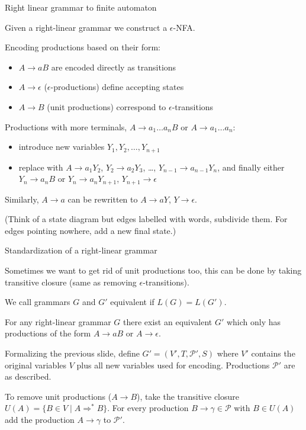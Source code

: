 \documentclass[handout]{beamer}
\begin{document}
\begin{frame}{Right linear grammar to finite automaton}

	Given a right-linear grammar we construct a $\epsilon$-NFA.

	Encoding productions based on their form: 
	\begin{itemize}
		\item $A\rightarrow aB$ are encoded directly as transitions
		\item $A\rightarrow\epsilon$ (\alert{$\epsilon$-productions}) define accepting states
		\item $A\rightarrow B$ (\alert{unit productions}) correspond to $\epsilon$-transitions
	\end{itemize}
	
	Productions with more terminals, $A\rightarrow a_1\dots a_n B$ or $A\rightarrow a_1\dots a_n$:
		
	\begin{itemize}
		\item  introduce new variables $Y_1,Y_2,\dots, Y_{n+1}$
		\item  replace with $A\rightarrow a_1Y_2$, $Y_2\rightarrow a_2Y_3$, \dots, $Y_{n-1}\rightarrow a_{n-1}Y_n$, and finally either $Y_n\rightarrow a_nB$ or $Y_n\rightarrow a_nY_{n+1}$, $Y_{n+1}\to\epsilon$
	\end{itemize}

	Similarly, $A\rightarrow a$ can be rewritten to $A\to aY$, $Y\to\epsilon$.

	(Think of a state diagram but edges labelled with words, subdivide them. For edges pointing nowhere, add a new final state.)

\end{frame}


\begin{frame}{Standardization of a right-linear grammar}

	Sometimes we want to get rid of unit productions too, this can be done by taking transitive closure (same as removing $\epsilon$-transitions).

	We call grammars $G$ and $G'$ \alert{equivalent} if $L(G)=L(G')$.
	\begin{lemma}
		For any right-linear grammar $G$ there exist an equivalent $G'$ which only has productions of the form $A\rightarrow aB$ or $A\rightarrow \epsilon$.
	\end{lemma}

	Formalizing the previous slide, define $G'=(V',T,\mathcal P',S)$ where $V'$ contains the original variables $V$ plus all new variables used for encoding. Productions $\mathcal P'$ are as described. 
	
	To remove unit productions ($A\to B$), take the transitive closure $U(A)=\{B\in V \mid A\Rightarrow^* B\}$. For every production $B\to\gamma\in\mathcal P$ with $B\in U(A)$ add the production $A\to\gamma$ to $\mathcal P'$.\hfill\qedsymbol

\end{frame}
\end{document}
